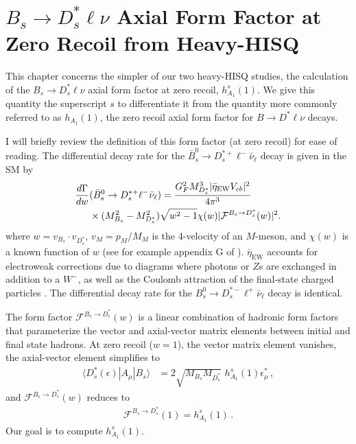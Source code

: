 ﻿﻿\chapter{$B_s\to D_s^*\ell\nu$ Axial Form Factor at Zero Recoil from Heavy-HISQ}
\label{chap:BsDsstar}

This chapter concerns the simpler of our two heavy-HISQ studies, the calculation of the $B_s\to D^*_s\ell\nu$ axial form factor at zero recoil, $h^s_{A_1}(1)$. We give this quantity the superscript $s$ to differentiate it from the quantity more commonly referred to as $h_{A_1}(1)$, the zero recoil axial form factor for $B\to D^*\ell\nu$ decays.

I will briefly review the definition of this form factor (at zero recoil) for ease of reading. The differential decay rate for the $\bar{B}_s^0\to D_s^{*+} \ell^- \bar{\nu}_{\ell}$ decay is given in the SM by
\begin{align}
  {d \Gamma \over dw} &(\bar{B}_s^0\to D_s^{*+} \ell^- \bar{\nu}_{\ell}) = {G_F^2 M_{D_s^*}^3 | \bar{\eta}_{\text{EW}} V_{cb} |^2 \over 4\pi^3}
\\  &\times(M_{B_s}^2-M_{D_s^*}^2) \sqrt{w^2-1} \chi(w) | \mathcal{F}^{B_s\to D_s^*}(w) |^2. \nonumber
\end{align}
where $w = v_{B_s} \cdot v_{D^*_s}$, $v_M = p_M/M_M$ is the 4-velocity of an $M$-meson, and $\chi(w)$ is a known function of $w$ (see for example appendix G of \cite{Harrison:2017fmw}). $\bar{\eta}_{\text{EW}}$ accounts for electroweak corrections due to diagrams where photons or $Z$s are exchanged in addition to a $W^-$, as well as the Coulomb attraction of the final-state charged particles \cite{SIRLIN198283,Ginsberg1968,PhysRevD.41.1736}. The differential decay rate for the $B_s^0\to D_s^{*-} \ell^+ \bar{\nu}_{\ell}$ decay is identical.

The form factor $\mathcal{F}^{B_s\to D_s^*}(w)$ is a linear combination of hadronic form factors that parameterize the vector and axial-vector matrix elements between initial and final state hadrons. At zero recoil ($w=1$), the vector matrix element vanishes, the axial-vector element simplifies to
\begin{align}
  \langle D^*_s(\epsilon)| A_{\mu} | B_s \rangle &= 2 \sqrt{M_{B_s}M_{D^*_s}}\,\, h^s_{A_1}(1) \epsilon^{*}_{\mu}\,,
\end{align}
and $\mathcal{F}^{B_s\to D_s^*}(w)$ reduces to
\begin{align}
  \mathcal{F}^{B_s\to D_s^*}(1) = h^s_{A_1}(1)\,.
\end{align}
Our goal is to compute $h^s_{A_1}(1)$.

